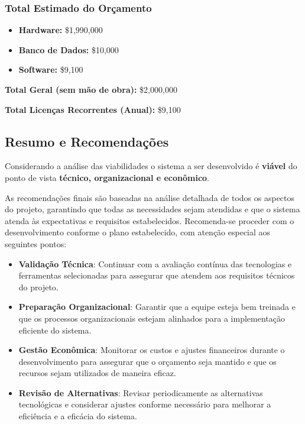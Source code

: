 \subsubsection{Total Estimado do Orçamento}

\begin{itemize}
    \item \textbf{Hardware:} \$1,990,000
    \item \textbf{Banco de Dados:} \$10,000
    \item \textbf{Software:} \$9,100
\end{itemize}

\textbf{Total Geral (sem mão de obra):} \$2,000,000

\textbf{Total Licenças Recorrentes (Anual):} \$9,100

\subsection{Resumo e Recomendações}

Considerando a análise das viabilidades o sistema a ser desenvolvido é \textbf{viável} do ponto de vista \textbf{técnico, organizacional e econômico}.

As recomendações finais são baseadas na análise detalhada de todos os aspectos do projeto, garantindo que todas as necessidades sejam atendidas e que o sistema atenda às expectativas e requisitos estabelecidos. Recomenda-se proceder com o desenvolvimento conforme o plano estabelecido, com atenção especial aos seguintes pontos:
\begin{itemize}
    \item \textbf{Validação Técnica}: Continuar com a avaliação contínua das tecnologias e ferramentas selecionadas para assegurar que atendem aos requisitos técnicos do projeto.
    \item \textbf{Preparação Organizacional}: Garantir que a equipe esteja bem treinada e que os processos organizacionais estejam alinhados para a implementação eficiente do sistema.
    \item \textbf{Gestão Econômica}: Monitorar os custos e ajustes financeiros durante o desenvolvimento para assegurar que o orçamento seja mantido e que os recursos sejam utilizados de maneira eficaz.
    \item \textbf{Revisão de Alternativas}: Revisar periodicamente as alternativas tecnológicas e considerar ajustes conforme necessário para melhorar a eficiência e a eficácia do sistema.
\end{itemize}
